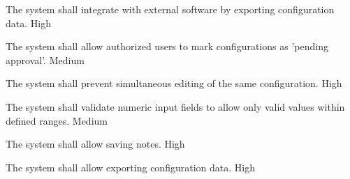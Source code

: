   {
    The system shall integrate with external software by exporting configuration data.
  }
  {High}

  {
    The system shall allow authorized users to mark configurations as 'pending approval'.
  }
  {Medium}

  {
    The system shall prevent simultaneous editing of the same configuration.
  }
  {High}

  {
    The system shall validate numeric input fields to allow only valid values within defined ranges.
  }
  {Medium}

  {
    The system shall allow saving notes.
  }
  {High}

  {
    The system shall allow exporting configuration data.
  }
  {High}
